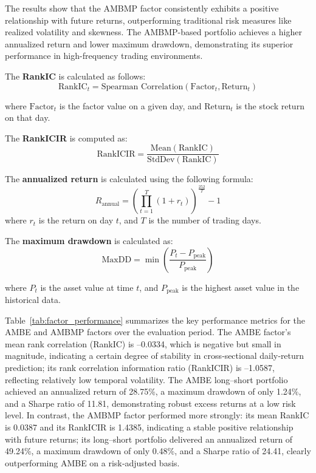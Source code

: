 \documentclass[preprint,12pt,authoryear]{elsarticle}
\begin{document}
The results show that the AMBMP factor consistently exhibits a positive relationship with future returns, outperforming traditional risk measures like realized volatility and skewness. The AMBMP-based portfolio achieves a higher annualized return and lower maximum drawdown, demonstrating its superior performance in high-frequency trading environments.

The \textbf{RankIC} is calculated as follows:
\begin{equation}
    \text{RankIC}_t = \text{Spearman Correlation}(\text{Factor}_t, \text{Return}_t)
\end{equation}

where \(\text{Factor}_t\) is the factor value on a given day, and \(\text{Return}_t\) is the stock return on that day.

The \textbf{RankICIR} is computed as:
\begin{equation}
    \text{RankICIR} = \frac{\text{Mean}(\text{RankIC})}{\text{StdDev}(\text{RankIC})} 
\end{equation}

The \textbf{annualized return} is calculated using the following formula:
\begin{equation}
    R_{\text{annual}} = \left( \prod_{t=1}^{T} (1 + r_t) \right)^{\frac{252}{T}} - 1
\end{equation}
where \(r_t\) is the return on day \(t\), and \(T\) is the number of trading days.

The \textbf{maximum drawdown} is calculated as:
\begin{equation}
    \text{MaxDD} = \min \left( \frac{P_t - P_{\text{peak}}}{P_{\text{peak}}} \right)
\end{equation}

where \(P_t\) is the asset value at time \(t\), and \(P_{\text{peak}}\) is the highest asset value in the historical data.

Table~\ref{tab:factor_performance} summarizes the key performance metrics for the AMBE and AMBMP factors over the evaluation period.
The AMBE factor’s mean rank correlation (RankIC) is –0.0334, which is negative but small in magnitude, indicating a certain degree of stability in cross‑sectional daily‑return prediction; its rank correlation information ratio (RankICIR) is –1.0587, reflecting relatively low temporal volatility. The AMBE long–short portfolio achieved an annualized return of 28.75\%, a maximum drawdown of only 1.24\%, and a Sharpe ratio of 11.81, demonstrating robust excess returns at a low risk level.
In contrast, the AMBMP factor performed more strongly: its mean RankIC is 0.0387 and its RankICIR is 1.4385, indicating a stable positive relationship with future returns; its long–short portfolio delivered an annualized return of 49.24\%, a maximum drawdown of only 0.48\%, and a Sharpe ratio of 24.41, clearly outperforming AMBE on a risk‑adjusted basis.
\end{document}
